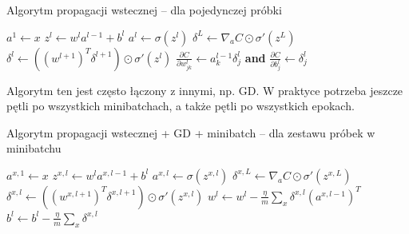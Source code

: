 \documentclass[10pt, oneside]{article}
\theoremstyle{remark}
\begin{document}
\begin{algorithm}
    \caption{Algorytm propagacji wstecznej -- dla pojedynczej próbki}
    \label{alg:backprop}
    \begin{algorithmic}[1] %
            \State $a^1 \gets x$ 
            	 
            		\State $z^{l} \gets w^l a^{l-1}+b^l$
            		\State $a^{l} \gets \sigma(z^{l})$
            	\EndFor
            	\State $\delta^{L} \gets \nabla_a C \odot \sigma'(z^L)$ 
            	 
            		\State $\delta^{l} \gets ((w^{l+1})^T \delta^{l+1}) \odot \sigma'(z^{l})$         
            	\EndFor
            	\State \Return $\frac{\partial C}{\partial w^l_{jk}} \gets a^{l-1}_k \delta^l_j$ \textbf{and} $\frac{\partial C}{\partial b^l_j} \gets \delta^l_j$ 
        \EndFunction
    \end{algorithmic}
\end{algorithm}

Algorytm ten jest często łączony z innymi, np. GD.
W praktyce potrzeba jeszcze pętli po wszystkich minibatchach, a także pętli po wszystkich epokach.

\begin{algorithm}
    \caption{Algorytm propagacji wstecznej + GD + minibatch -- dla zestawu próbek w minibatchu}
    \label{alg:backprop_sgf}
    \begin{algorithmic}[1] %
        		 
	            \State $a^{x,1} \gets x$ 
	            	 
	            		\State $z^{x,l} \gets w^l a^{x,l-1}+b^l$
	            		\State $a^{x,l} \gets \sigma(z^{x,l})$
	            	\EndFor
	            	\State $\delta^{x,L} \gets \nabla_a C \odot \sigma'(z^{x,L})$ 
	            	 
	            		\State $\delta^{x,l} \gets ((w^{x,l+1})^T \delta^{x,l+1}) \odot \sigma'(z^{x,l})$         
	            	\EndFor
	         \EndFor
	          
	         	\State $w^l \gets w^l-\frac{\eta}{m} \sum_x \delta^{x,l} (a^{x,l-1})^T$
	         	\State $b^l \gets b^l-\frac{\eta}{m}
  \sum_x \delta^{x,l}$
	         \EndFor
        \EndFunction
    \end{algorithmic}
\end{algorithm}
\end{document}
